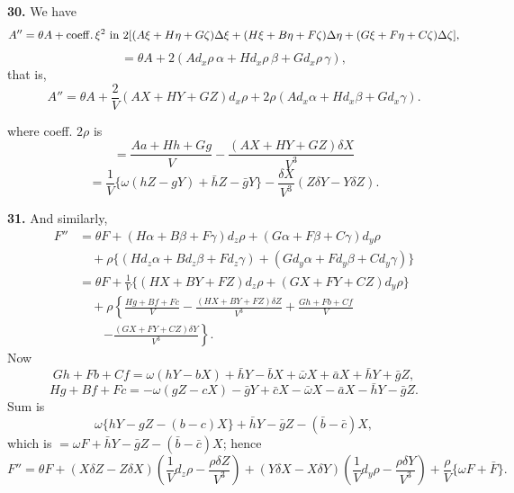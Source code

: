\documentclass[11pt,a4paper]{article}
\newcommand{\Dx}{d_x}
\newcommand{\Dy}{d_y}
\newcommand{\Dz}{d_z}
\begin{document}
\textbf{30.} We have
\[
A''=\theta A+\operatorname{coeff.}\xi^2\hbox{ in }
2[(A\xi+H\eta+G\zeta)\Delta\xi+(H\xi+B\eta+F\zeta)\Delta\eta
 +(G\xi+F\eta+C\zeta)\Delta\zeta],
\]
\[
=\theta A+2(A\Dx\rho\,\alpha+H\Dx\rho\,\beta+G\Dx\rho\,\gamma),
\]
that is,
\[
A''=\theta A+\frac{2}{V}(AX+HY+GZ)\Dx\rho
+2\rho(A\Dx\alpha+H\Dx\beta+G\Dx\gamma).
\]

\newpage
where coeff. \(2\rho\) is
\[
=\frac{Aa+Hh+Gg}{V}
-\frac{(AX+HY+GZ)\delta X}{V^3}
\]
\[
=\frac{1}{V}\{\omega(hZ-gY)+\bar hZ-\bar gY\}
-\frac{\delta X}{V^3}(Z\delta Y-Y\delta Z).
\]

\textbf{31.} And similarly,
\begin{align*}
F''&=\theta F+(H\alpha+B\beta+F\gamma)\Dz\rho+(G\alpha+F\beta+C\gamma)\Dy\rho\\
&\quad+\rho\{(H\Dz\alpha+B\Dz\beta+F\Dz\gamma)
 +(G\Dy\alpha+F\Dy\beta+C\Dy\gamma)\}\\
&=\theta F+\frac1V\{(HX+BY+FZ)\Dz\rho+(GX+FY+CZ)\Dy\rho\}\\
&\quad+\rho\left\{
\frac{Hg+Bf+Fc}{V}-\frac{(HX+BY+FZ)\delta Z}{V^3}
+\frac{Gh+Fb+Cf}{V}\right.\\
&\qquad\left.
-\frac{(GX+FY+CZ)\delta Y}{V^3}\right\}.
\end{align*}
Now
\[
Gh+Fb+Cf=\omega(hY-bX)+\bar hY-\bar bX+\bar\omega X+\bar aX+\bar hY+\bar gZ,
\]
\[
Hg+Bf+Fc=-\omega(gZ-cX)-\bar gY+\bar cX-\bar\omega X-\bar aX-\bar hY-\bar gZ.
\]
Sum is
\[
\omega\{hY-gZ-(b-c)X\}+\bar hY-\bar gZ-(\bar b-\bar c)X,
\]
which is \(=\omega F+\bar hY-\bar gZ-(\bar b-\bar c)X\); hence
\[
F''=\theta F+(X\delta Z-Z\delta X)\left(\frac1V\Dz\rho-\frac{\rho\delta Z}{V^3}\right)
+(Y\delta X-X\delta Y)\left(\frac1V\Dy\rho-\frac{\rho\delta Y}{V^3}\right)
+\frac{\rho}{V}\{\omega F+\bar F\}.
\]
\end{document}
